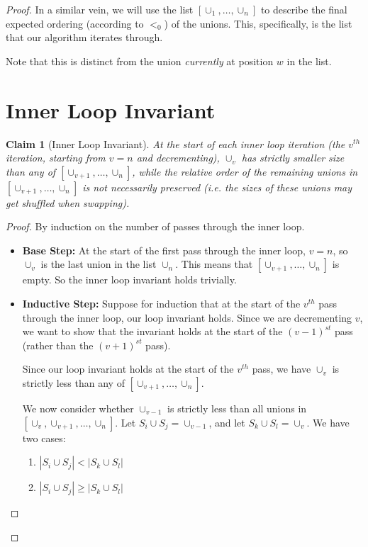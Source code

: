 \documentclass[12pt]{article}
\newcommand{\snote}[1]{{Sa\'ul: {{\color{blue}#1}}}}
\newtheorem{claim}{Claim}
\begin{document}
\begin{proof}
In a similar vein, we will use the list $[\cup_1, \ldots, \cup_n]$ to describe the final expected ordering (according to $<_0$) of the unions.  This, specifically, is the list that our algorithm iterates through.

Note that this is distinct from the union \textit{currently} at position $w$ in the list.


\section{Inner Loop Invariant}

\begin{claim}[Inner Loop Invariant]
At the start of each inner loop iteration (the $v^{th}$ iteration, starting from $v = n$ and decrementing), $\cup_v$ has strictly smaller size than any of $[\cup_{v+1}, \ldots, \cup_{n}]$, while the relative order of the remaining unions in $[\cup_{v+1}, \ldots, \cup_n]$ is not necessarily preserved (i.e. the sizes of these unions may get shuffled when swapping).


\end{claim}
\begin{proof}
By induction on the number of passes through the inner loop.

\begin{itemize}
    \item 

\textbf{Base Step:} At the start of the first pass through the inner loop, $v = n$, so $\cup_v$ is the last union in the list $\cup_n$.  This means that $[\cup_{v+1}, \ldots, \cup_{n}]$ is empty.  So the inner loop invariant holds trivially.

    \item
\textbf{Inductive Step:}
Suppose for induction that at the start of the $v^{th}$ pass through the inner loop, our loop invariant holds.  Since we are decrementing $v$, we want to show that the invariant holds at the start of the $(v-1)^{st}$ pass (rather than the $(v+1)^{st}$ pass).

Since our loop invariant holds at the start of the $v^{th}$ pass, we have $\cup_v$ is strictly less than any of $[\cup_{v+1}, \ldots, \cup_{n}]$.%

We now consider whether $\cup_{v-1}$ is strictly less than all unions in $[\cup_{v}, \cup_{v+1}, \ldots, \cup_{n}]$. Let $S_i \cup S_j = \cup_{v-1}$, and let $S_k \cup S_l = \cup_{v}$.  We have two cases:
\begin{enumerate}
    \item $|S_i \cup S_j| < |S_k \cup S_l|$
    \item $|S_i \cup S_j| \ge |S_k \cup S_l|$
\end{enumerate}


\end{itemize}
\end{proof}
\end{proof}
\end{document}
